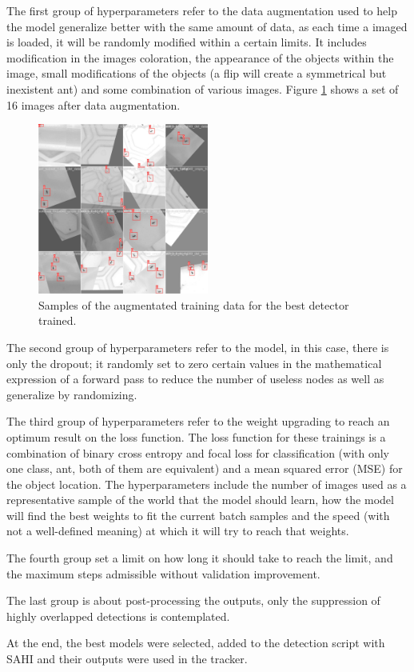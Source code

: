 
{
    The first group of hyperparameters refer to the data augmentation used to help the model generalize better with the same amount of data, as each time a imaged is loaded, it will be randomly modified within a certain limits. 
    It includes modification in the images coloration, the appearance of the objects within the image, small modifications of the objects (a flip will create a symmetrical but inexistent ant) and some combination of various images. 
    Figure \ref{fig:detector_data_augmentated} shows a set of 16 images after data augmentation.
}

\begin{figure}[!tp]
    \centering
    \includegraphics[width=0.5\textwidth]{figures/05_methodology/TrainDataDetector.jpg}
    \caption[YOLOv8 data augmentated]{\footnotesize{Samples of the augmentated training data for the best detector trained.}}
    \label{fig:detector_data_augmentated}
\end{figure}

{
    The second group of hyperparameters refer to the model, in this case, there is only the dropout; it randomly set to zero certain values in the mathematical expression of a forward pass to reduce the number of useless nodes as well as generalize by randomizing.
}

{
    The third group of hyperparameters refer to the weight upgrading to reach an optimum result on the loss function.
    The loss function for these trainings is a combination of binary cross entropy and focal loss for classification (with only one class, ant, both of them are equivalent) and a mean squared error (\ac{MSE}) for the object location.
    The hyperparameters include the number of images used as a representative sample of the world that the model should learn, how the model will find the best weights to fit the current batch samples and the speed (with not a well-defined meaning) at which it will try to reach that weights.
}

{
    The fourth group set a limit on how long it should take to reach the limit, and the maximum steps admissible without validation improvement.
}

{
    The last group is about post-processing the outputs, only the suppression of highly overlapped detections is contemplated.
}

{
    At the end, the best models were selected, added to the detection script with \ac{SAHI} and their outputs were used in the tracker.
}
